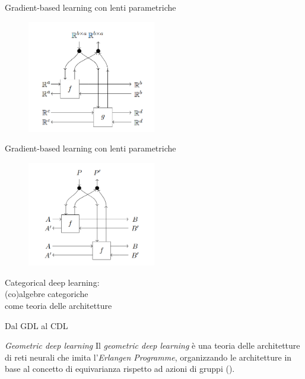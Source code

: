\documentclass{beamer}
\begin{document}
\begin{frame}{Gradient-based learning con lenti parametriche}
    \begin{figure}
        \begin{center}
            \includegraphics[width=0.5\textwidth]{figures/weight_tying.png}
            \caption*{\cite{cruttwell2022categorical}}
        \end{center}
    \end{figure}
\end{frame}

\begin{frame}{Gradient-based learning con lenti parametriche}
    \begin{figure}
        \begin{center}
            \includegraphics[width=0.5\textwidth]{figures/batching.png}
            \caption*{\cite{cruttwell2022categorical}}
        \end{center}
    \end{figure}
\end{frame}

\begin{frame}[standout]
    \huge Categorical deep learning: \\\large (co)algebre categoriche \\come teoria delle architetture
\end{frame}

\begin{frame}{Dal GDL al CDL}
    \begin{block}{\textit{Geometric deep learning}}
        Il \textit{geometric deep learning} è una teoria delle architetture di reti neurali che imita l'\textit{Erlangen Programme}, organizzando le architetture in base al concetto di equivarianza rispetto ad azioni di gruppi (\cite{bronstein2021geometric}).
    \end{block}
\end{frame}
\end{document}
